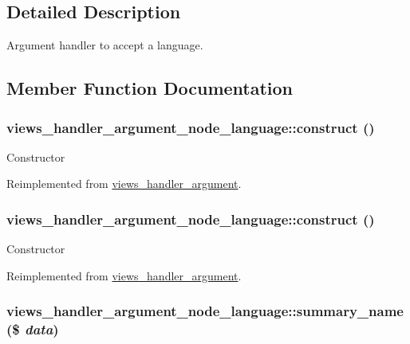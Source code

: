\subsection{Detailed Description}
Argument handler to accept a language. 

\subsection{Member Function Documentation}
\hypertarget{classviews__handler__argument__node__language_96f52469109294ad151b3ca21c261795}{
\subsubsection[{construct}]{\setlength{\rightskip}{0pt plus 5cm}views\_\-handler\_\-argument\_\-node\_\-language::construct ()}}
\label{classviews__handler__argument__node__language_96f52469109294ad151b3ca21c261795}


Constructor 

Reimplemented from \hyperlink{classviews__handler__argument_93594a31e95e1a14cead4f038d7b321b}{views\_\-handler\_\-argument}.\hypertarget{classviews__handler__argument__node__language_96f52469109294ad151b3ca21c261795}{
\subsubsection[{construct}]{\setlength{\rightskip}{0pt plus 5cm}views\_\-handler\_\-argument\_\-node\_\-language::construct ()}}
\label{classviews__handler__argument__node__language_96f52469109294ad151b3ca21c261795}


Constructor 

Reimplemented from \hyperlink{classviews__handler__argument_93594a31e95e1a14cead4f038d7b321b}{views\_\-handler\_\-argument}.\hypertarget{classviews__handler__argument__node__language_a07770dbbc40710c5369f76f4d4b6a35}{
\subsubsection[{summary\_\-name}]{\setlength{\rightskip}{0pt plus 5cm}views\_\-handler\_\-argument\_\-node\_\-language::summary\_\-name (\$ {\em data})}}
\label{classviews__handler__argument__node__language_a07770dbbc40710c5369f76f4d4b6a35}


